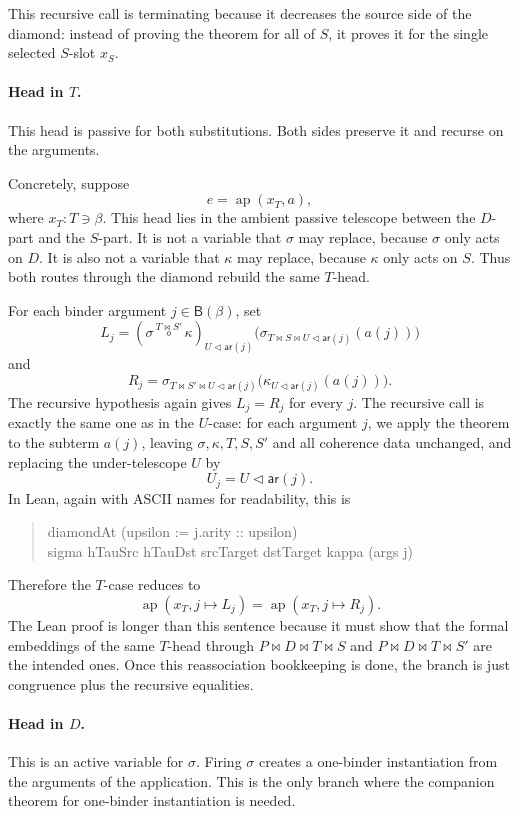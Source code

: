 \documentclass[11pt]{article}
\newcommand{\B}{\mathsf{B}}
\newcommand{\arity}{\mathsf{ar}}
\newcommand{\ext}{\mathbin{\triangleleft}}
\newcommand{\pcomp}[3]{#1 \overset{#2}{\circ} #3}
\begin{document}
This recursive call is terminating because it decreases the source side of the
diamond: instead of proving the theorem for all of \(S\), it proves it for the
single selected \(S\)-slot \(x_S\).

\paragraph{Head in \(T\).}
This head is passive for both substitutions.  Both sides preserve it and
recurse on the arguments.

Concretely, suppose
\[
  e = \operatorname{ap}(x_T,a),
\]
where \(x_T : T \ni \beta\).  This head lies in the ambient passive telescope
between the \(D\)-part and the \(S\)-part.  It is not a variable that
\(\sigma\) may replace, because \(\sigma\) only acts on \(D\).  It is also not a
variable that \(\kappa\) may replace, because \(\kappa\) only acts on \(S\).
Thus both routes through the diamond rebuild the same \(T\)-head.

For each binder argument \(j \in \B(\beta)\), set
\[
  L_j =
  (\pcomp{\sigma}{T \bowtie S'}{\kappa})_{U \ext \arity(j)}
  \bigl(
    \sigma_{T \bowtie S \bowtie U \ext \arity(j)}(a(j))
  \bigr)
\]
and
\[
  R_j =
  \sigma_{T \bowtie S' \bowtie U \ext \arity(j)}
  \bigl(
    \kappa_{U \ext \arity(j)}(a(j))
  \bigr).
\]
The recursive hypothesis again gives \(L_j = R_j\) for every \(j\).  The
recursive call is exactly the same one as in the \(U\)-case: for each argument
\(j\), we apply the theorem to the subterm \(a(j)\), leaving
\(\sigma,\kappa,T,S,S'\) and all coherence data unchanged, and replacing the
under-telescope \(U\) by
\[
  U_j = U \ext \arity(j).
\]
In Lean, again with ASCII names for readability, this is
\begin{quote}
\small\ttfamily
diamondAt (upsilon := j.arity :: upsilon)\\
\hspace*{2em}sigma hTauSrc hTauDst srcTarget dstTarget kappa (args j)
\end{quote}
Therefore
the \(T\)-case reduces to
\[
  \operatorname{ap}(x_T, j \mapsto L_j)
  =
  \operatorname{ap}(x_T, j \mapsto R_j).
\]
The Lean proof is longer than this sentence because it must show that the
formal embeddings of the same \(T\)-head through
\(P \bowtie D \bowtie T \bowtie S\) and
\(P \bowtie D \bowtie T \bowtie S'\) are the intended ones.  Once this
reassociation bookkeeping is done, the branch is just congruence plus the
recursive equalities.

\paragraph{Head in \(D\).}
This is an active variable for \(\sigma\).  Firing \(\sigma\) creates a
one-binder instantiation from the arguments of the application.  This is the
only branch where the companion theorem for one-binder instantiation is needed.
\end{document}
